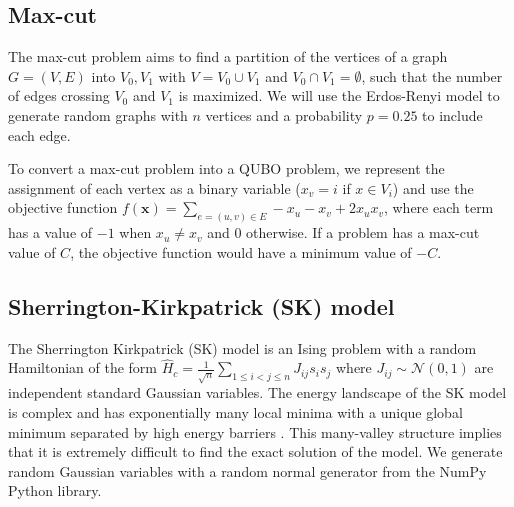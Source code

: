 \subsection*{Max-cut}
The max-cut problem aims to find a partition of the vertices of a graph $G = (V, E)$ into $V_0, V_1$ with $V = V_0 \cup V_1$ and $V_0 \cap V_1 = \emptyset$, such that the number of edges crossing $V_0$ and $V_1$ is maximized. We will use the Erdos-Renyi model to generate random graphs with $n$ vertices and a probability $p=0.25$ to include each edge.

To convert a max-cut problem into a QUBO problem, we represent the assignment of each vertex as a binary variable ($x_v = i$ if $x \in V_i$) and use the objective function $f(\mathbf{x}) = \sum_{e = (u, v) \in E} -x_u - x_v + 2x_u x_v$, where each term has a value of $-1$ when $x_u  \neq x_v$ and $0$ otherwise. If a problem has a max-cut value of $C$, the objective function would have a minimum value of $-C$. 

\subsection*{Sherrington-Kirkpatrick (SK) model}
The Sherrington Kirkpatrick (SK) model is an Ising problem with a random Hamiltonian of the form $\hat{H}_c = \frac{1}{\sqrt{n}} \sum_{1 \leq i < j \leq n} J_{ij}s_i s_j$
where $J_{ij} \sim \mathcal{N}(0,1)$ are independent standard Gaussian variables. The energy landscape of the SK model is complex and has exponentially many local minima with a unique global minimum separated by high energy barriers \cite{skmodel}. This many-valley structure implies that it is extremely difficult to find the exact solution of the model. We generate random Gaussian variables with a random normal generator from the NumPy Python library.



